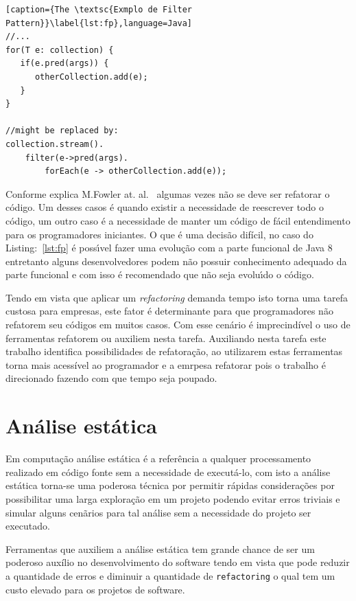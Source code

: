 \begin{lstlisting}[caption={The \textsc{Exmplo de Filter Pattern}}\label{lst:fp},language=Java] 
//...
for(T e: collection) {
   if(e.pred(args)) {
      otherCollection.add(e);
   }
}

//might be replaced by:
collection.stream().
	filter(e->pred(args).
		forEach(e -> otherCollection.add(e));
\end{lstlisting}


Conforme explica M.Fowler at. al.~\cite{martinFowlerRafactoring} algumas vezes n\~{a}o se deve ser refatorar o c\'{o}digo. Um desses casos \'{e} quando existir a necessidade de reescrever todo o c\'{o}digo, um outro caso \'{e} a necessidade de manter um  c\'{o}digo de f\'{a}cil entendimento para os programadores iniciantes. O que \'{e} uma decis\~{a}o dif\'{i}cil, no caso do Listing:~\ref{lst:fp} \'{e} poss\'{\i}vel fazer uma evolu\c{c}\~{a}o com a parte funcional de Java 8 entretanto alguns desenvolvedores podem n\~{a}o possuir  conhecimento adequado da parte funcional e com isso \'{e} recomendado que n\~{a}o seja evolu\'{\i}do o c\'{o}digo.


Tendo em vista que aplicar um \textit{refactoring} demanda tempo isto torna uma tarefa custosa para empresas, este fator \'{e} determinante para que programadores n\~{a}o refatorem seu c\'{o}digos em muitos casos. Com esse cen\'{a}rio \'{e} imprecind\'{i}vel o uso de ferramentas refatorem ou auxiliem nesta tarefa. Auxiliando nesta tarefa este trabalho identifica possibilidades de refatora\c{c}\~{a}o, ao utilizarem estas ferramentas torna mais acessível ao programador e a emrpesa refatorar pois o trabalho é direcionado fazendo com que tempo seja poupado.



\section{Análise estática}\label{sec:as}

Em computa\c{c}\~{a}o an\'{a}lise est\'{a}tica \'{e} a refer\^{e}ncia a qualquer processamento realizado em c\'{o}digo fonte sem a necessidade de execut\'{a}-lo, com isto a an\'{a}lise est\'{a}tica torna-se uma poderosa t\'{e}cnica por permitir r\'{a}pidas considera\c{c}\~{o}es por possibilitar uma larga explora\c{c}\~{a}o em um projeto podendo evitar erros triviais e simular alguns cen\~{a}rios para tal an\'{a}lise sem a necessidade do projeto ser executado.

Ferramentas que auxiliem a an\'{a}lise est\'{a}tica tem grande chance de ser um poderoso aux\'{i}lio no desenvolvimento do software tendo em vista que pode reduzir a quantidade de erros e diminuir a quantidade de \texttt{refactoring} o qual tem um custo elevado para os projetos de software.


